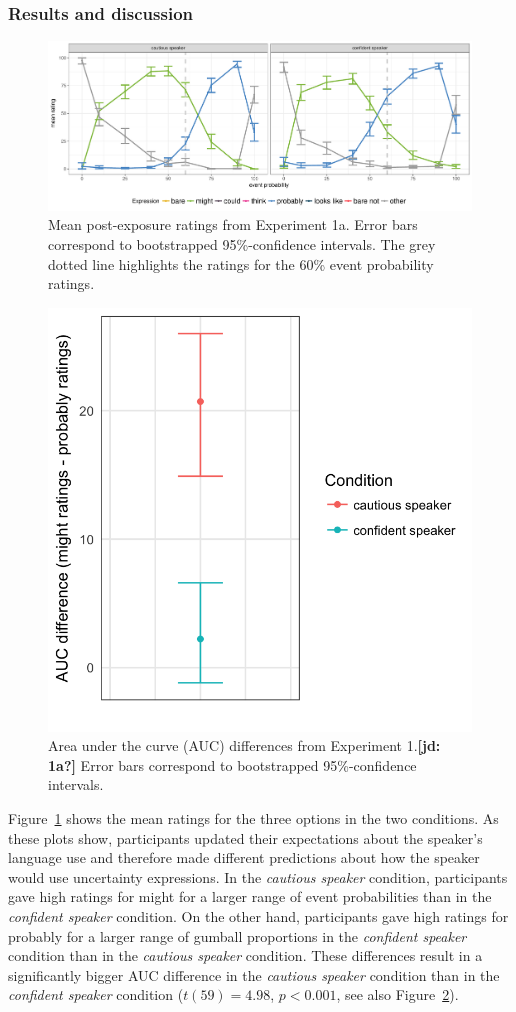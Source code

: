 \documentclass[lucida,biblatex]{sp} %
\newcommand{\jd}[1]{\textcolor{PinkyPurple}{\textbf{[jd: #1]}}}
\begin{document}
\subsubsection{Results and discussion}

\begin{figure}
\includegraphics[width=\textwidth]{plots/exp-1-ratings.pdf}
\caption{Mean post-exposure ratings from Experiment 1a. Error bars correspond to bootstrapped 95\%-confidence intervals.  The grey dotted line highlights the ratings for the 60\% event probability ratings.  \label{fig:adaptation-results-prod}}
\end{figure}

\begin{figure}
\center
\includegraphics[width=.5\textwidth]{plots/adaptation-auc-production.png}
\caption{Area under the curve (AUC) differences from Experiment 1.\jd{1a?} Error bars correspond to bootstrapped 95\%-confidence intervals.  \label{fig:adaptation-auc-prod}}
\end{figure}

Figure~\ref{fig:adaptation-results-prod} shows the mean ratings for the three options in the two conditions. As these plots show, participants updated their expectations about the speaker's language use and therefore made different predictions about how the speaker would use uncertainty expressions. In the \emph{cautious speaker} condition, participants gave high ratings for {\sc might} for a larger range of event probabilities than in the \emph{confident speaker} condition. On the other hand, participants gave high ratings for {\sc probably} for a larger range of gumball proportions in the \emph{confident speaker} condition than in the \emph{cautious speaker} condition. These differences result in a significantly bigger AUC difference in the \emph{cautious speaker} condition than in the \emph{confident speaker} condition ($t(59) = 4.98$, $p < 0.001$, see also Figure~\ref{fig:adaptation-auc-prod}).
\end{document}
